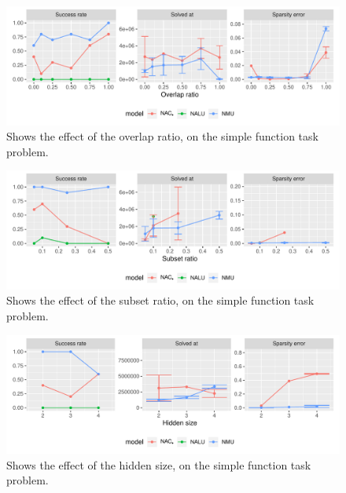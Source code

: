 \begin{figure}[h]
\centering
\includegraphics[width=\linewidth]{results/simple_function_static_overlap.pdf}
\caption{Shows the effect of the overlap ratio, on the simple function task problem.}
\label{fig:simple-fnction-static-overlap}
\end{figure}

\begin{figure}[h]
\centering
\includegraphics[width=\linewidth]{results/simple_function_static_subset.pdf}
\caption{Shows the effect of the subset ratio, on the simple function task problem.}
\label{fig:simple-fnction-static-subset}
\end{figure}

\begin{figure}[h]
\centering
\includegraphics[width=\linewidth]{results/simple_function_static_hidden_size.pdf}
\caption{Shows the effect of the hidden size, on the simple function task problem.}
\label{fig:simple-fnction-static-subset}
\end{figure}


